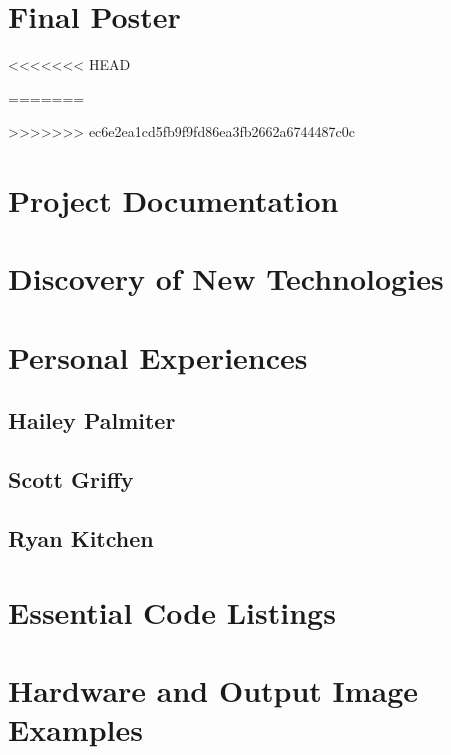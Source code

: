 \documentclass[letterpaper, onecolumn,10pt,draftclsnofoot]{IEEEtran}
\begin{document}
\section{Final Poster}
<<<<<<< HEAD
	
=======

>>>>>>> ec6e2ea1cd5fb9f9fd86ea3fb2662a6744487c0c

\section{Project Documentation}
	
	
\newpage
\section{Discovery of New Technologies}
	

\newpage	
\section{Personal Experiences}
	\subsection{Hailey Palmiter}
		
	\subsection{Scott Griffy}
		
	\subsection{Ryan Kitchen}
		

\begin{appendices}	

\newpage
\section{Essential Code Listings}
	
	
\newpage	
\section{Hardware and Output Image Examples}
	

\end{appendices}
   
\end{document}
